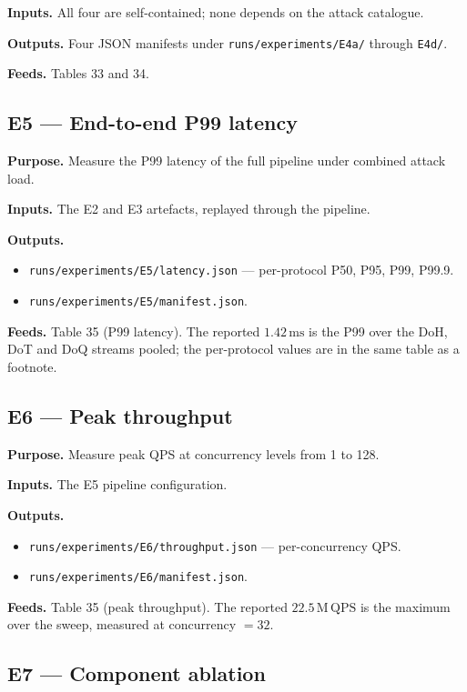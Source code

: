 \textbf{Inputs.} All four are self-contained; none depends on the
attack catalogue.

\textbf{Outputs.} Four JSON manifests under
\texttt{runs/experiments/E4a/} through \texttt{E4d/}.

\textbf{Feeds.} Tables 33 and 34.

\subsection{E5 --- End-to-end P99 latency}

\textbf{Purpose.} Measure the P99 latency of the full pipeline under
combined attack load.

\textbf{Inputs.} The E2 and E3 artefacts, replayed through the
pipeline.

\textbf{Outputs.}
\begin{itemize}
\item \texttt{runs/experiments/E5/latency.json} — per-protocol P50,
      P95, P99, P99.9.
\item \texttt{runs/experiments/E5/manifest.json}.
\end{itemize}

\textbf{Feeds.} Table 35 (P99 latency). The reported
$1.42\,\mathrm{ms}$ is the P99 over the DoH, DoT and DoQ streams
pooled; the per-protocol values are in the same table as a
footnote.

\subsection{E6 --- Peak throughput}

\textbf{Purpose.} Measure peak QPS at concurrency levels from 1 to
128.

\textbf{Inputs.} The E5 pipeline configuration.

\textbf{Outputs.}
\begin{itemize}
\item \texttt{runs/experiments/E6/throughput.json} — per-concurrency
      QPS.
\item \texttt{runs/experiments/E6/manifest.json}.
\end{itemize}

\textbf{Feeds.} Table 35 (peak throughput). The reported
$22.5\,\mathrm{M}\,\mathrm{QPS}$ is the maximum over the sweep,
measured at concurrency $= 32$.

\subsection{E7 --- Component ablation}

